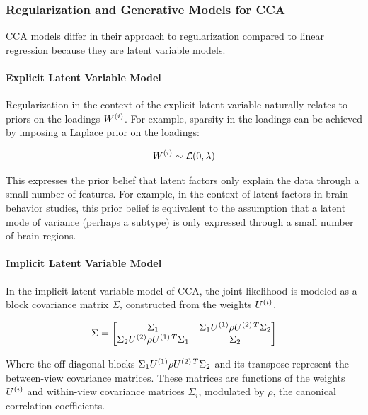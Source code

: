 \subsubsection{Regularization and Generative Models for CCA}
CCA models differ in their approach to regularization compared to linear regression because they are latent variable models.

\paragraph{Explicit Latent Variable Model}
Regularization in the context of the explicit latent variable naturally relates to priors on the loadings \(W^{(i)}\).
For example, sparsity in the loadings can be achieved by imposing a Laplace prior on the loadings:

\begin{align}
    W^{(i)} \sim \mathcal{L}(0, \lambda)
\end{align}

This expresses the prior belief that latent factors only explain the data through a small number of features.
For example, in the context of latent factors in brain-behavior studies, this prior belief is equivalent to the assumption that a latent mode of variance (perhaps a subtype) is only expressed through a small number of brain regions.

\paragraph{Implicit Latent Variable Model}
In the implicit latent variable model of CCA, the joint likelihood is modeled as a block covariance matrix \(\Sigma\)\citep{suo2017sparse}, constructed from the weights \(U^{(i)}\).

\begin{equation}
    \Sigma = \begin{bmatrix}
                 \Sigma_{1} & \Sigma_{1} U^{(1)} \rho U^{(2)\,T} \Sigma_{2} \\
                 \Sigma_{2} U^{(2)} \rho U^{(1)\,T} \Sigma_{1} & \Sigma_{2}
    \end{bmatrix}
\end{equation}

Where the off-diagonal blocks \(\Sigma_{1} U^{(1)} \rho U^{(2)\,T} \Sigma_{2}\) and its transpose represent the between-view covariance matrices.
These matrices are functions of the weights \(U^{(i)}\) and within-view covariance matrices \(\Sigma_{i}\), modulated by \(\rho\), the canonical correlation coefficients.

